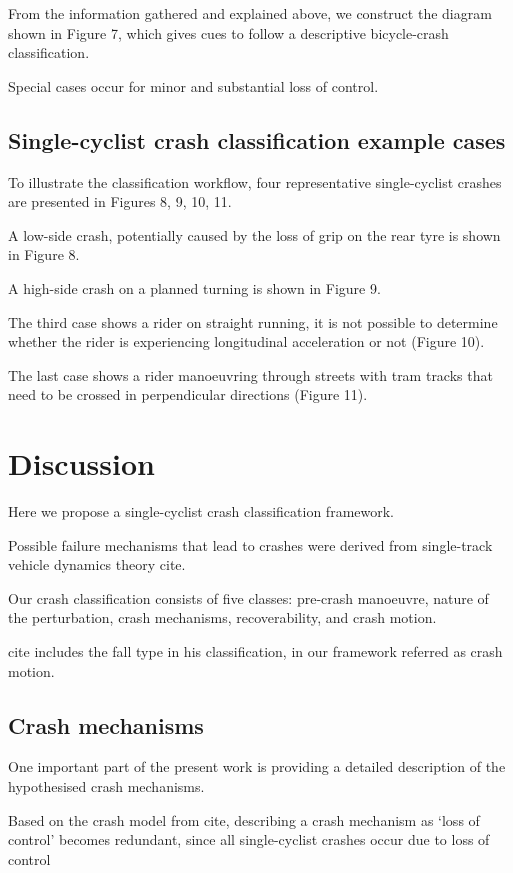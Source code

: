 \documentclass{article}
\begin{document}
From the information gathered and explained above, we construct the diagram shown in Figure 7, which gives cues to follow a descriptive bicycle-crash classification. 

Special cases occur for minor and substantial loss of control.

\subsection{Single-cyclist crash classification example cases}

To illustrate the classification workflow, four representative single-cyclist crashes are presented in Figures 8, 9, 10, 11.

A low-side crash, potentially caused by the loss of grip on the rear tyre is shown in Figure 8. 

A high-side crash on a planned turning is shown in Figure 9.

The third case shows a rider on straight running, it is not possible to determine whether the rider is experiencing longitudinal acceleration or not (Figure 10).

The last case shows a rider manoeuvring through streets with tram tracks that need to be crossed in perpendicular directions (Figure 11).


\section{Discussion}

Here we propose a single-cyclist crash classification framework.

Possible failure mechanisms that lead to crashes were derived from single-track vehicle dynamics theory cite{}.

Our crash classification consists of five classes: pre-crash manoeuvre, nature of the perturbation, crash mechanisms, recoverability, and crash motion.

cite{}  includes the fall type in his classification, in our framework referred as crash motion.

\subsection{Crash mechanisms}

One important part of the present work is providing a detailed description of the hypothesised crash mechanisms.

Based on the crash model from cite{}, describing a crash mechanism as ‘loss of control’ becomes redundant, since all single-cyclist crashes occur due to loss of control
\end{document}

